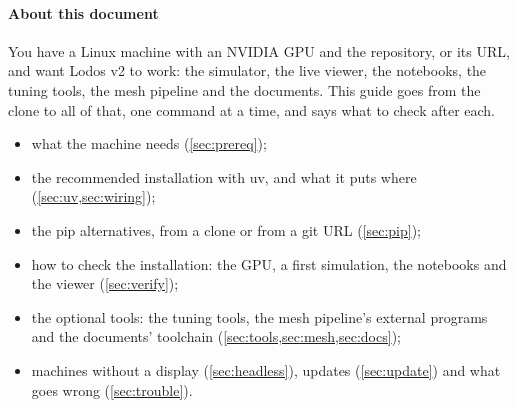 



\paragraph{About this document}
You have a Linux machine with an NVIDIA GPU and the repository, or its URL, and want Lodos v2 to work: the simulator, the live viewer, the notebooks, the tuning tools, the mesh pipeline and the documents. This guide goes from the clone to all of that, one command at a time, and says what to check after each.

\begin{itemize}
\item what the machine needs (\cref{sec:prereq});
\item the recommended installation with uv, and what it puts where (\cref{sec:uv,sec:wiring});
\item the pip alternatives, from a clone or from a git URL (\cref{sec:pip});
\item how to check the installation: the GPU, a first simulation, the notebooks and the viewer (\cref{sec:verify});
\item the optional tools: the tuning tools, the mesh pipeline's external programs and the documents' toolchain (\cref{sec:tools,sec:mesh,sec:docs});
\item machines without a display (\cref{sec:headless}), updates (\cref{sec:update}) and what goes wrong (\cref{sec:trouble}).
\end{itemize}

